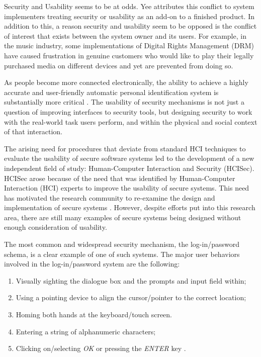 \documentclass{article}
\begin{document}
Security and Usability seems to be at odds. Yee\cite{yee2004aligning} attributes this conflict to system implementers treating security or usability as an add-on to a finished product. In addition to this, a reason security and usability seem to be opposed is the conflict of interest that exists between the system owner and its users. For example, in the music industry, some implementations of Digital Rights Management (DRM) have caused frustration in genuine customers who would like to play their legally purchased media on different devices and yet are prevented from doing so. 

As people become more connected electronically, the ability to achieve a highly accurate and user-friendly automatic personal identification system is substantially more critical \cite{jain2000biometric}. The usability of security mechanisms is not just a question of improving interfaces to security tools, but designing security to work with the real-world task users perform, and within the physical and social context of that interaction. 

The arising need for procedures that deviate from standard HCI techniques to evaluate the usability of secure software systems led to the development of a new independent field of study: Human-Computer Interaction and Security (HCISec). HCISec arose because of the need that was identified by Human-Computer Interaction (HCI) experts to improve the usability of secure systems. This need has motivated the research community to re-examine the design and implementation of secure systems \cite{kainda2010security}. However, despite efforts put into this research area, there are still many examples of secure systems being designed without enough consideration of usability.

The most common and widespread security mechanism, the log-in/password schema, is a clear example of one of such systems. The major user behaviors involved in the log-in/password system are the following:
\begin{enumerate}
\item Visually sighting the dialogue box and the prompts and input field within;
\item Using a pointing device to align the cursor/pointer to the correct location;
\item Homing both hands at the keyboard/touch screen.
\item Entering a string of alphanumeric characters;
\item Clicking on/selecting \textit{OK} or pressing the \textit{ENTER} key \cite{schultz2001usability}.
\end{enumerate}
\end{document}
